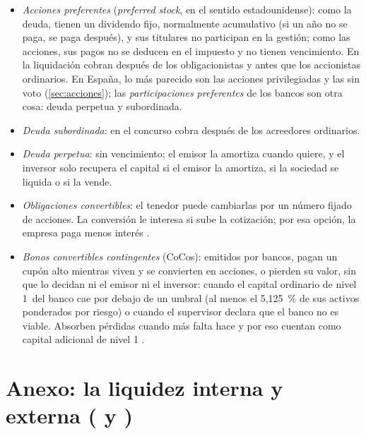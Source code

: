 \documentclass[11pt]{article}
\begin{document}
\begin{itemize}
\item \emph{Acciones preferentes} (\emph{preferred stock}, en el sentido estadounidense): como la deuda, tienen un dividendo fijo, normalmente acumulativo (si un año no se paga, se paga después), y sus titulares no participan en la gestión; como las acciones, sus pagos no se deducen en el impuesto y no tienen vencimiento. En la liquidación cobran después de los obligacionistas y antes que los accionistas ordinarios. En España, lo más parecido son las acciones privilegiadas y las sin voto (\ref{sec:acciones}); las \emph{participaciones preferentes} de los bancos son otra cosa: deuda perpetua y subordinada.
\item \emph{Deuda subordinada}: en el concurso cobra después de los acreedores ordinarios.
\item \emph{Deuda perpetua}: sin vencimiento; el emisor la amortiza cuando quiere, y el inversor solo recupera el capital si el emisor la amortiza, si la sociedad se liquida o si la vende.
\item \emph{Obligaciones convertibles}: el tenedor puede cambiarlas por un número fijado de acciones. La conversión le interesa si sube la cotización; por esa opción, la empresa paga menos interés .
\item \emph{Bonos convertibles contingentes} (CoCos): emitidos por bancos, pagan un cupón alto mientras viven y se convierten en acciones, o pierden su valor, sin que lo decidan ni el emisor ni el inversor: cuando el capital ordinario de nivel 1~del banco cae por debajo de un umbral (al menos el 5,125~\% de sus activos ponderados por riesgo)\nocite{UE2013CRR} o cuando el supervisor declara que el banco no es viable. Absorben pérdidas cuando más falta hace y por eso cuentan como capital adicional de nivel 1 .
\end{itemize}

\section{Anexo: la liquidez interna y externa ( y )}\label{anexo:holmstrom-tirole}
\end{document}
